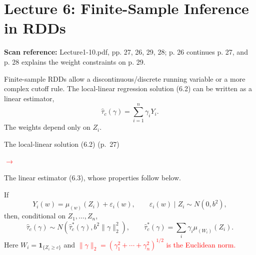 \documentclass[11pt,a4paper]{article}
\newcommand{\sourcepages}[1]{\par{\small\sffamily\color{muted}\textbf{Scan reference:} #1\par}\nobreak\smallskip\nopagebreak[4]}
\newcommand{\inkred}[1]{\textcolor{red}{#1}}
\newcommand{\notearrow}[3]{%
\par\Needspace{6\baselineskip}\smallskip
\noindent\begin{minipage}[c]{0.43\linewidth}\raggedright\color{#1}#2\end{minipage}%
\hfill\textcolor{#1}{\(\longrightarrow\)}\hfill%
\begin{minipage}[c]{0.43\linewidth}\raggedright#3\end{minipage}\par\smallskip}
\begin{document}
\section{Lecture 6: Finite-Sample Inference in RDDs}
\sourcepages{Lecture1-10.pdf, pp. 27, 26, 29, 28; p. 26 continues p. 27, and p. 28 explains the weight constraints on p. 29.}
Finite-sample RDDs allow a discontinuous/discrete running variable or a more complex cutoff rule. The local-linear regression solution (6.2) can be written as a linear estimator,
\[
\widehat\tau_c(\gamma)=\sum_{i=1}^n\gamma_iY_i.\tag{6.3 in the notes}
\]
The weights depend only on $Z_i$.
\notearrow{red}{The local-linear solution (6.2) (p.~27)}{The linear estimator (6.3), whose properties follow below.}
 If
\[
Y_i(w)=\mu_{(w)}(Z_i)+\varepsilon_i(w),\qquad
\varepsilon_i(w)\mid Z_i\sim N(0,b^2),
\]
then, conditional on $Z_1,\ldots,Z_n$,
\[
\widehat\tau_c(\gamma)\sim N(\widehat\tau_c^*(\gamma),b^2\|\gamma\|_2^2),
\qquad \widehat\tau_c^*(\gamma)=\sum_i\gamma_i\mu_{(W_i)}(Z_i).
\]
Here $W_i=\mathbf1_{\{Z_i\geq c\}}$ and \inkred{$\|\gamma\|_2=(\gamma_1^2+\cdots+\gamma_n^2)^{1/2}$ is the Euclidean norm.}
\end{document}
